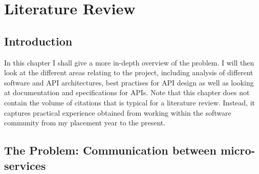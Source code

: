 \chapter{Literature Review}

\section{Introduction}
In this chapter I shall give a more in-depth overview of the problem. I will then look at the different areas relating to the project, including analysis of different software and API architectures, best practises for API design as well as looking at documentation and specifications for APIs. Note that this chapter does not contain the volume of citations that is typical for a literature review. Instead, it captures practical experience obtained from working within the software community from my placement year to the present.

\section{The Problem: Communication between micro-services}


